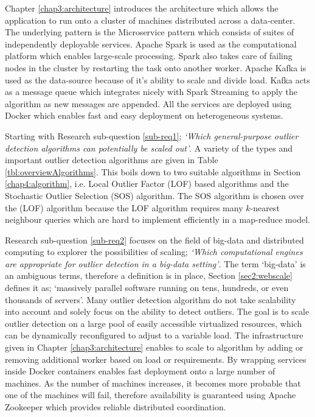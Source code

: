 Chapter \ref{chap3:architecture} introduces the architecture which allows the application to run onto a cluster of machines distributed across a data-center. The underlying pattern is the Microservice pattern which consists of suites of independently deployable services. Apache Spark is used as the computational platform which enables large-scale processing. Spark also takes care of failing nodes in the cluster by restarting the task onto another worker. Apache Kafka is used as the data-source because of it's ability to scale and divide load. Kafka acts as a message queue which integrates nicely with Spark Streaming to apply the algorithm as new messages are appended. All the services are deployed using Docker which enables fast and easy deployment on heterogeneous systems.

Starting with Research sub-question \ref{sub-req1}; \emph{`Which general-purpose outlier detection algorithms can potentially be scaled out'}. A variety of the types and important outlier detection algorithms are given in Table \ref{tbl:overviewAlgorithms}. This boils down to two suitable algorithms in Section \ref{chap4:algorithm}, i.e. Local Outlier Factor (LOF) based algorithms and the Stochastic Outlier Selection (SOS) algorithm. The SOS algorithm is chosen over the (LOF) algorithm because the LOF algorithm requires many $k$-nearest neighbour queries which are hard to implement efficiently in a map-reduce model.

Research sub-question \ref{sub-req2} focuses on the field of big-data and distributed computing to explorer the possibilities of scaling; \emph{`Which computational engines are appropriate for outlier detection in a big-data setting'}. The term `big-data' is an ambiguous terms, therefore a definition is in place, Section \ref{sec2:webscale} defines it as; `massively parallel software running on tens, hundreds, or even thousands of servers'. Many outlier detection algorithm do not take scalability into account and solely focus on the ability to detect outliers. The goal is to scale outlier detection on a large pool of easily accessible virtualized resources, which can be dynamically reconfigured to adjust to a variable load. The infrastructure given in Chapter \ref{chap3:architecture} enables to scale to algorithm by adding or removing additional worker based on load or requirements. By wrapping services inside Docker containers enables fast deployment onto a large number of machines. As the number of machines increases, it becomes more probable that one of the machines will fail, therefore availability is guaranteed using Apache Zookeeper which provides reliable distributed coordination.

